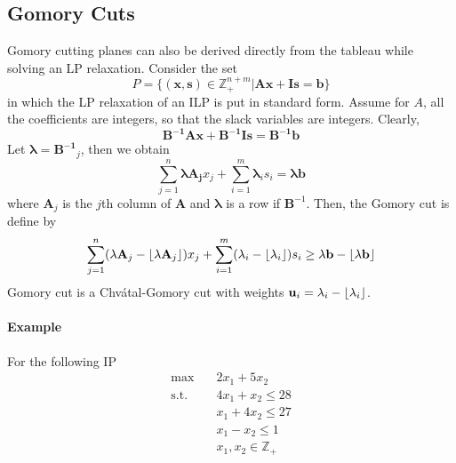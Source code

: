         \subsection{Gomory Cuts}
            Gomory cutting planes can also be derived directly from the tableau while solving an LP relaxation. Consider the set
            \begin{equation*}
                P = \{(\mathbf{x, s}) \in \mathbb{Z}_+^{n + m}| \mathbf{Ax + Is = b}\}
            \end{equation*}
            in which the LP relaxation of an ILP is put in standard form. Assume for $A$, all the coefficients are integers, so that the slack variables are integers. Clearly,
            \begin{equation*}
                \mathbf{B^{-1}Ax + B^{-1}Is = B^{-1}b}
            \end{equation*}
            Let $\mathbf{\lambda} = \mathbf{B^{-1}}_j$, then we obtain
            \begin{equation*}
                \sum_{j = 1}^n \mathbf{\lambda A_j} x_j + \sum_{i = 1}^m \mathbf{\lambda}_i s_i = \mathbf{\lambda b}
            \end{equation*}
            where $\mathbf{A}_j$ is the $j$th column of $\mathbf{A}$ and $\mathbf{\lambda}$ is a row if $\mathbf{B}^{-1}$. Then, the Gomory cut is define by
            \begin{equation*}
                \sum_{j = 1}^n (\mathbf{\lambda A}_j - \left\lfloor \mathbf{\lambda A}_j \right\rfloor) x_j + \sum_{i = 1}^m (\mathbf{\lambda}_i - \left\lfloor \mathbf{\lambda}_i \right\rfloor) s_i \ge \mathbf{\lambda b} - \left\lfloor \mathbf{\lambda b} \right\rfloor
            \end{equation*}
            Gomory cut is a Chv\'atal-Gomory cut with weights $\mathbf{u}_i = \mathbf{\lambda}_i - \left\lfloor \mathbf{\lambda}_i \right\rfloor$.

            \paragraph{Example}
                For the following IP
                \begin{align*}
                    \max \quad & 2 x_1 + 5 x_2\\
                    \text{s.t.} \quad & 4 x_1 + x_2 \le 28\\
                    & x_1 + 4 x_2 \le 27\\
                    & x_1 - x_2 \le 1\\
                    & x_1, x_2 \in \mathbb{Z}_+
                \end{align*}

